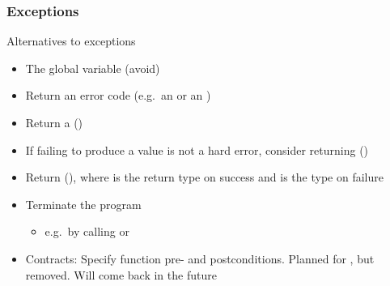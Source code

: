 \begin{advanced}
\begin{frame}[fragile]
  \frametitle{Exceptions}
  \begin{block}{Alternatives to exceptions}
    \begin{itemize}
      \item The global variable  (avoid)
      \item Return an error code (e.g.\ an  or an )
      \item Return a  ()
      \item If failing to produce a value is not a hard error, consider returning  ()
      \item Return  (), where  is the return type on success and  is the type on failure
      \item Terminate the program
        \begin{itemize}
        \item e.g.\ by calling  or 
        \end{itemize}
      \item Contracts: Specify function pre- and postconditions. Planned for , but removed. Will come back in the future
    \end{itemize}
  \end{block}
\end{frame}


\end{advanced}
